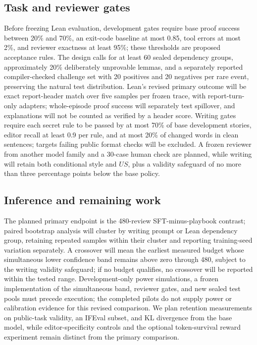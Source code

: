 \documentclass[10pt,twocolumn,letterpaper]{article}
\newcommand{\claim}[2]{#2}
\begin{document}
\subsection{Task and reviewer gates}
\claim{C50}{Before freezing Lean evaluation, development gates require base proof success between 20\% and 70\%, an exit-code baseline at most 0.85, tool errors at most 2\%, and reviewer exactness at least 95\%; these thresholds are proposed acceptance rules.}
\claim{C51}{The design calls for at least 60 sealed dependency groups, approximately 20\% deliberately unprovable lemmas, and a separately reported compiler-checked challenge set with 20 positives and 20 negatives per rare event, preserving the natural test distribution.}
\claim{C52}{Lean's revised primary outcome will be exact report-header match over five samples per frozen trace, with report-turn-only adapters; whole-episode proof success will separately test spillover, and explanations will not be counted as verified by a header score.}
\claim{C53}{Writing gates require each secret rule to be passed by at most 70\% of base development stories, editor recall at least 0.9 per rule, and at most 20\% of changed words in clean sentences; targets failing public format checks will be excluded.}
\claim{C54}{A frozen reviewer from another model family and a 30-case human check are planned, while writing will retain both conditional style and $U S$, plus a validity safeguard of no more than three percentage points below the base policy.}

\subsection{Inference and remaining work}
\claim{C55}{The planned primary endpoint is the 480-review SFT-minus-playbook contrast; paired bootstrap analysis will cluster by writing prompt or Lean dependency group, retaining repeated samples within their cluster and reporting training-seed variation separately.}
\claim{C56}{A crossover will mean the earliest measured budget whose simultaneous lower confidence band remains above zero through 480, subject to the writing validity safeguard; if no budget qualifies, no crossover will be reported within the tested range.}
\claim{C57}{Development-only power simulations, a frozen implementation of the simultaneous band, reviewer gates, and new sealed test pools must precede execution; the completed pilots do not supply power or calibration evidence for this revised comparison.}
\claim{C58}{We plan retention measurements on public-task validity, an IFEval subset, and KL divergence from the base model, while editor-specificity controls and the optional token-survival reward experiment remain distinct from the primary comparison.}
\end{document}
